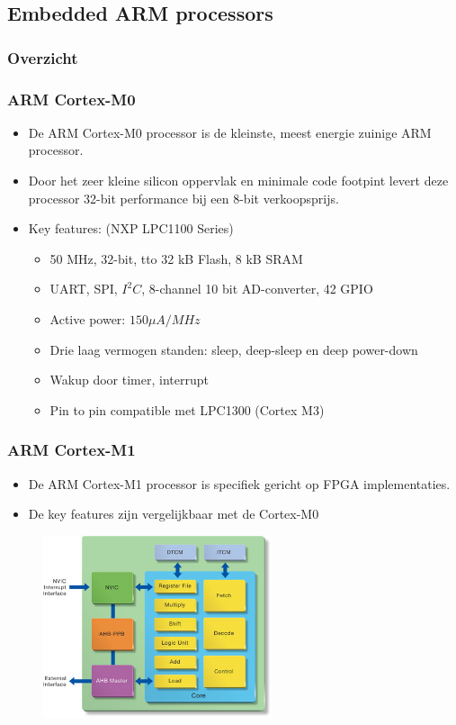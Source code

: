 \documentclass{beamer}
\begin{document}
\subsection{Embedded ARM processors}
\begin{frame}
\frametitle{Overzicht}
\tableofcontents[sectionstyle=show/shaded,subsectionstyle=show/shaded] 
\end{frame}

\begin{frame} 
\frametitle{ARM Cortex-M0}
  \begin{itemize}
  \item <1-> De ARM Cortex-M0 processor is de kleinste, meest energie zuinige ARM processor.
  \item <2-> Door het zeer kleine silicon oppervlak en minimale code footpint levert deze processor 32-bit performance bij een 8-bit verkoopsprijs.
  \item <3-> Key features: (NXP LPC1100 Series)
	\begin{itemize}
	\item 50 MHz, 32-bit, tto 32 kB Flash, 8 kB SRAM
	\item UART, SPI, $I^2C$,  8-channel 10 bit AD-converter, 42 GPIO
	\item Active power: $150\mu A / MHz$
	\item Drie laag vermogen standen: sleep, deep-sleep en deep power-down
	\item Wakup door timer, interrupt
	\item Pin to pin compatible met LPC1300 (Cortex M3)
	\end{itemize}
  \end{itemize}
\end{frame}

\begin{frame} 
\frametitle{ARM Cortex-M1}
  \begin{itemize}
  \item <1-> De ARM Cortex-M1 processor is specifiek gericht op FPGA implementaties.
  \item <2-> De key features zijn vergelijkbaar met de Cortex-M0
  \end{itemize}
\begin{figure}[h] \begin{center}
\includegraphics[width=0.6\textwidth]{figures/armM1.png}
\end{center} \end{figure}
\end{frame}
\end{document}
